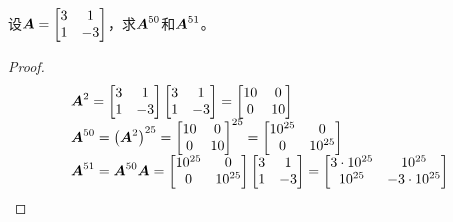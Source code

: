 \begin{problem}\label{problem-1.3}
设\(\boldsymbol{A}=\begin{bmatrix}3&1\\1&-3\end{bmatrix}\)，求\(\boldsymbol{A}^{50}\)和\(\boldsymbol{A}^{51}\)。
\end{problem}
\begin{proof}
    \begin{equation*}
        \begin{array}{lll}
            \boldsymbol{A}^2=\begin{bmatrix}3&1\\1&-3\end{bmatrix}\begin{bmatrix}3&1\\1&-3\end{bmatrix}=\begin{bmatrix}10&0\\0&10\end{bmatrix}     \\
            \boldsymbol{A}^{50}=\left( \boldsymbol{A}^2 \right)^{25}={\begin{bmatrix}10&0\\0&10\end{bmatrix}}^{25}=\begin{bmatrix}10^{25}&0\\0&10^{25}\end{bmatrix} \\
            \boldsymbol{A}^{51}=\boldsymbol{A}^{50}\boldsymbol{A}=\begin{bmatrix}10^{25}&0\\0&10^{25}\end{bmatrix}\begin{bmatrix}3&1\\1&-3\end{bmatrix}=\begin{bmatrix}3\cdot10^{25}&10^{25}\\10^{25}&-3\cdot10^{25}\end{bmatrix}
        \end{array}
    \end{equation*}
\end{proof}

